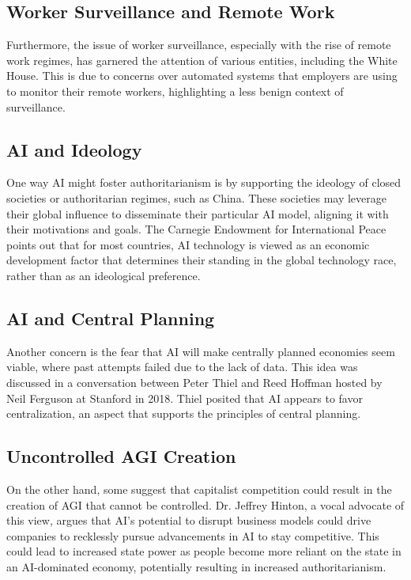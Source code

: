\subsection{Worker Surveillance and Remote Work}
Furthermore, the issue of worker surveillance, especially with the rise of remote work regimes, has garnered the attention of various entities, including the White House. This is due to concerns over automated systems that employers are using to monitor their remote workers, highlighting a less benign context of surveillance.

\subsection{AI and Ideology}
One way AI might foster authoritarianism is by supporting the ideology of closed societies or authoritarian regimes, such as China. These societies may leverage their global influence to disseminate their particular AI model, aligning it with their motivations and goals. The Carnegie Endowment for International Peace points out that for most countries, AI technology is viewed as an economic development factor that determines their standing in the global technology race, rather than as an ideological preference.

\subsection{AI and Central Planning}
Another concern is the fear that AI will make centrally planned economies seem viable, where past attempts failed due to the lack of data. This idea was discussed in a conversation between Peter Thiel and Reed Hoffman hosted by Neil Ferguson at Stanford in 2018. Thiel posited that AI appears to favor centralization, an aspect that supports the principles of central planning.

\subsection{Uncontrolled AGI Creation}
On the other hand, some suggest that capitalist competition could result in the creation of AGI that cannot be controlled. Dr. Jeffrey Hinton, a vocal advocate of this view, argues that AI's potential to disrupt business models could drive companies to recklessly pursue advancements in AI to stay competitive. This could lead to increased state power as people become more reliant on the state in an AI-dominated economy, potentially resulting in increased authoritarianism.

